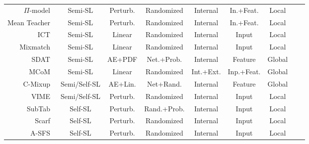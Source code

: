 \documentclass[parskip=full]{scrartcl}
\begin{document}
\begin{longtable}{rcccccccc}
    $\Pi$-model~\cite{samuli2017temporal} & Semi-SL & Perturb. & Randomized & Internal & In.+Feat. & Local \\
    Mean Teacher~\cite{tarvainen2017mean} & Semi-SL & Perturb. & Randomized & Internal & In.+Feat. & Local \\
    ICT~\cite{verma2022interpolation} & Semi-SL & Linear & Randomized & Internal & Input & Local \\
    Mixmatch~\cite{berthelot2019mixmatch} & Semi-SL & Linear & Randomized & Internal & Input & Local \\
    SDAT~\cite{fang2022semi} & Semi-SL & AE+PDF & Net.+Prob. & Internal & Feature & Global \\
    MCoM~\cite{li2022mcom} & Semi-SL & Linear & Randomized & Int.+Ext. & Inp.+Feat. & Global \\
    C-Mixup~\cite{darabi2021contrastive} & Semi/Self-SL & AE+Lin. & Net+Rand.  & Internal & Feature & Global \\
    VIME~\cite{yoon2020vime} & Semi/Self-SL & Perturb. & Randomized & Internal & Input & Local \\
    SubTab~\cite{ucar2021subtab} & Self-SL & Perturb. & Rand.+Prob. & Internal & Input & Local \\
    Scarf~\cite{bahri2022scarf} & Self-SL & Perturb. & Randomized & Internal & Input & Local \\
    A-SFS~\cite{qiu2022sfs} & Self-SL & Perturb. & Randomized & Internal & Input & Local \\
\end{longtable}
\endgroup


% 
% 
% 
\end{document}
